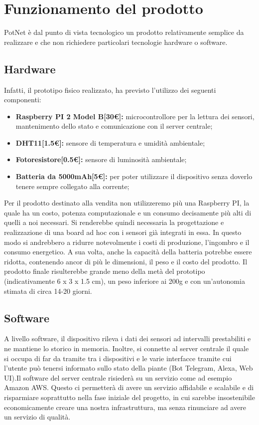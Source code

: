 \section{Funzionamento del prodotto}

PotNet è dal punto di vista tecnologico un prodotto relativamente semplice da realizzare e che non richiedere particolari tecnologie hardware o software. 

\subsection{Hardware}

Infatti, il prototipo fisico realizzato, ha previsto l'utilizzo dei seguenti componenti:

\begin{itemize}
	\item \textbf{Raspberry PI 2 Model B[30€]:} microcontrollore per la lettura dei sensori, mantenimento dello stato e comunicazione con il server centrale;
	\item \textbf{DHT11[1.5€]:} sensore di temperatura e umidità ambientale;
	\item \textbf{Fotoresistore[0.5€]:} sensore di luminosità ambientale;
	\item \textbf{Batteria da 5000mAh[5€]:} per poter utilizzare il dispositivo senza doverlo tenere sempre collegato alla corrente;
\end{itemize}

Per il prodotto destinato alla vendita non utilizzeremo più una Raspberry PI, la quale ha un costo, potenza computazionale e un consumo decisamente più alti di quelli a noi necessari. Si renderebbe quindi necessaria la progettazione e realizzazione di una board ad hoc con i sensori già integrati in essa. In questo modo si andrebbero a ridurre notevolmente i costi di produzione, l'ingombro e il consumo energetico. A sua volta, anche la capacità della batteria potrebbe essere ridotta, contenendo ancor di più le dimensioni, il peso e il costo del prodotto. Il prodotto finale risulterebbe grande meno della metà del prototipo (indicativamente 6 x 3 x 1.5 cm), un peso inferiore ai 200g e con un'autonomia stimata di circa 14-20 giorni.

\subsection{Software}

A livello software, il dispositivo rileva i dati dei sensori ad intervalli prestabiliti e ne mantiene lo storico in memoria. Inoltre, si connette al server centrale il quale si occupa di far da tramite tra i dispositivi e le varie interfacce tramite cui l'utente può tenersi informato sullo stato della piante (Bot Telegram, Alexa, Web UI).\newline\newline Il software del server centrale risiederà su un servizio come ad esempio Amazon AWS. Questo ci permetterà di avere un servizio affidabile e scalabile e di risparmiare soprattutto nella fase iniziale del progetto, in cui sarebbe insostenibile economicamente creare una nostra infrastruttura, ma senza rinunciare ad avere un servizio di qualità.


